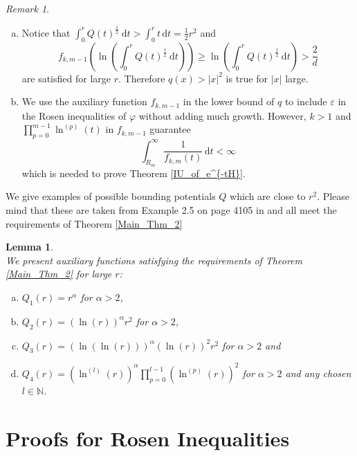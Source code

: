 \documentclass[12pt,longbibliography]{article}
\def\N{\mathbb{N}}
\def\d{\,\mathrm{d}}
\newtheorem{lem}[thm]{Lemma}
\theoremstyle{definition}
\theoremstyle{remark}
\newtheorem{rem}[thm]{Remark}
\theoremstyle{example}
\begin{document}
\begin{rem} \label{Remark 1} \
\begin{enumerate}[a)]

\item Notice that $\int_{0}^{r} Q(t)^{\frac{1}{2}} \ \mathrm{d}t > \int_{0}^{r} t \d t = \frac{1}{2}r^{2}$ and 
$$
f_{k, m-1} \left( \ln \left( \int_{0}^{r} Q(t)^{\frac{1}{2}} \ \mathrm{d}t \right) \right) \geq 
\ln \left( \int_{0}^{r} Q(t)^{\frac{1}{2}} \ \mathrm{d}t \right) > \frac{2}{d} 
$$
are satisfied for large $r$. Therefore $q(x) > |x|^{2}$ is true for $|x|$ large.

\item We use the auxiliary function $f_{k, m-1}$ in the lower bound of $q$ to include $\varepsilon$ in the Rosen inequalities
of $\varphi$ without adding much growth. However, $k > 1$ and $\prod_{p=0}^{m-1} \ln^{(p)}(t)$ in $f_{k,m-1}$ 
guarantee 
$$
\int_{R_{m}}^{\infty} \frac{1}{f_{k, m} (t)} \d t < \infty
$$
which is needed to prove Theorem \ref{IU_of_e^{-tH}}.\\

\end{enumerate}
\end{rem}

We give examples of possible bounding potentials $Q$ which are close to $r^{2}$. Please mind that these are taken 
from Example 2.5 on page 4105 in \cite{AlziaryTakac09} and all meet the requirements of Theorem \ref{Main_Thm_2}

\begin{lem} \label{Lemma_1} \ \\
We present auxiliary functions satisfying the requirements of Theorem \ref{Main_Thm_2} for large $r$:
\begin{enumerate}[a)]
\item $Q_{1}(r) = r^{\alpha}$ for $\alpha > 2$,
\item $Q_{2}(r) = \left(\ln(r) \right)^{\alpha} r^{2} $ for $\alpha > 2$,
\item $Q_{3}(r) = \left( \ln\left( \ln(r)\right) \right)^{\alpha} \left(\ln(r) \right)^{2} r^{2}$ for $\alpha > 2$ and
\item $Q_{4}(r) = \left( \ln^{(l)}(r) \right)^{\alpha} \prod_{p=0}^{l-1} \left( \ln^{(p)}(r) \right)^{2}$ for $\alpha > 2$ and any 
chosen $l \in \N$.\\
\end{enumerate}
\end{lem}



\section{Proofs for Rosen Inequalities} \label{Proofs_for_Rosen_Inequalities}
\end{document}
